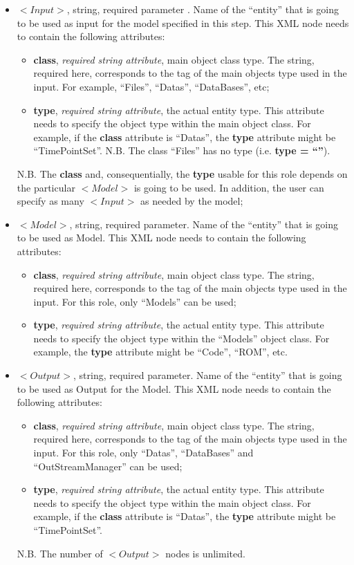 \begin{itemize}
\item $<Input>$, string, required parameter . Name of the ``entity'' that is going to be used as input for the model specified in this step. This XML node needs to contain the following attributes:
\begin{itemize}
  \item \textbf{class}, \textit{required string attribute}, main object class type. The string, required here, corresponds to the tag of the main objects type used in the input. For example, ``Files'', ``Datas'', ``DataBases'', etc;
  \item \textbf{type}, \textit{required string attribute}, the actual entity type. This attribute needs to specify the object type within the main object class. For example, if the  \textbf{class} attribute is ``Datas'', the \textbf{type} attribute might be ``TimePointSet''. N.B. The class ``Files'' has no type (i.e. \textbf{type = ``''}).
\end{itemize}
N.B. The \textbf{class} and, consequentially,  the \textbf{type} usable for this role depends on the particular $<Model>$ is going to be used. In addition, the user can specify as many $<Input>$ as needed by the model;
\item $<Model>$, string, required parameter. Name of the ``entity'' that is going to be used as Model. This XML node needs to contain the following attributes:
\begin{itemize}
  \item \textbf{class}, \textit{required string attribute}, main object class type. The string, required here, corresponds to the tag of the main objects type used in the input. For this role, only ``Models'' can be used;
  \item \textbf{type}, \textit{required string attribute}, the actual entity type. This attribute needs to specify the object type within the ``Models'' object class. For example, the \textbf{type} attribute might be ``Code'', ``ROM'', etc.
\end{itemize}
\item $<Output>$, string, required parameter. Name of the ``entity'' that is going to be used as Output for the Model. This XML node needs to contain the following attributes:
\begin{itemize}
  \item \textbf{class}, \textit{required string attribute}, main object class type. The string, required here, corresponds to the tag of the main objects type used in the input. For this role, only ``Datas'', ``DataBases'' and ``OutStreamManager'' can be used;
  \item \textbf{type}, \textit{required string attribute}, the actual entity type. This attribute needs to specify the object type within the main object class. For example, if the  \textbf{class} attribute is ``Datas'', the \textbf{type} attribute might be ``TimePointSet''.
\end{itemize}
N.B. The number of $<Output>$ nodes is unlimited.
\end{itemize}

